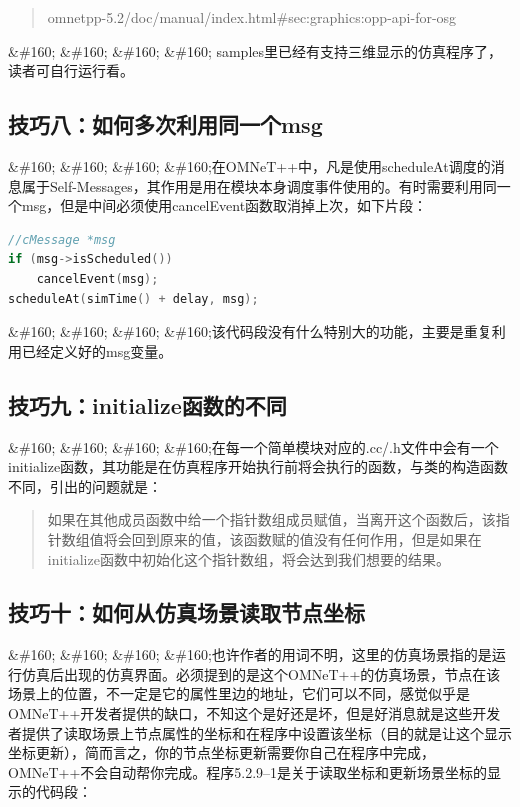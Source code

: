 \begin{quote}
omnetpp-5.2\slash doc\slash manual\slash index.html\#sec:graphics:opp-api-for-osg 
\end{quote}

\&\#160; \&\#160; \&\#160; \&\#160; samples里已经有支持三维显示的仿真程序了，读者可自行运行看。

\subsection{技巧八：如何多次利用同一个msg}
\label{技巧八：如何多次利用同一个bmsgb}

\&\#160; \&\#160; \&\#160; \&\#160;在OMNeT++中，凡是使用scheduleAt调度的消息属于Self-Messages，其作用是用在模块本身调度事件使用的。有时需要利用同一个msg，但是中间必须使用cancelEvent函数取消掉上次，如下片段：

\begin{lstlisting}[language=c]
//cMessage *msg
if (msg->isScheduled())
    cancelEvent(msg);
scheduleAt(simTime() + delay, msg);
\end{lstlisting}

\&\#160; \&\#160; \&\#160; \&\#160;该代码段没有什么特别大的功能，主要是重复利用已经定义好的msg变量。

\subsection{技巧九：initialize函数的不同}
\label{技巧九：initialize函数的不同}

\&\#160; \&\#160; \&\#160; \&\#160;在每一个简单模块对应的.cc\slash .h文件中会有一个initialize函数，其功能是在仿真程序开始执行前将会执行的函数，与类的构造函数不同，引出的问题就是：

\begin{quote}
如果在其他成员函数中给一个指针数组成员赋值，当离开这个函数后，该指针数组值将会回到原来的值，该函数赋的值没有任何作用，但是如果在initialize函数中初始化这个指针数组，将会达到我们想要的结果。
\end{quote}

\subsection{技巧十：如何从仿真场景读取节点坐标}
\label{技巧十：如何从仿真场景读取节点坐标}

\&\#160; \&\#160; \&\#160; \&\#160;也许作者的用词不明，这里的仿真场景指的是运行仿真后出现的仿真界面。必须提到的是这个OMNeT++的仿真场景，节点在该场景上的位置，不一定是它的属性里边的地址，它们可以不同，感觉似乎是OMNeT++开发者提供的缺口，不知这个是好还是坏，但是好消息就是这些开发者提供了读取场景上节点属性的坐标和在程序中设置该坐标（目的就是让这个显示坐标更新），简而言之，你的节点坐标更新需要你自己在程序中完成，OMNeT++不会自动帮你完成。程序5.2.9--1是关于读取坐标和更新场景坐标的显示的代码段：

